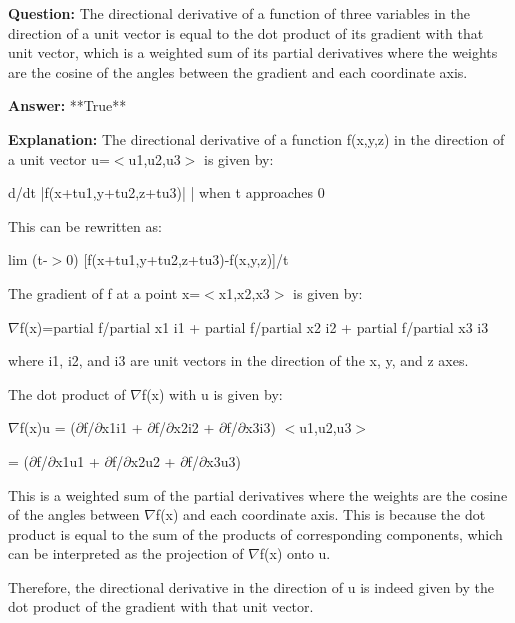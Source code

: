 \documentclass{article}
\begin{document}
                \vspace{0.5cm} 
        
            
                \textbf {Question:} The directional derivative of a function of three variables in the direction of a unit vector is equal to the dot product of its gradient with that unit vector, which is a weighted sum of its partial derivatives where the weights are the cosine of the angles between the gradient and each coordinate axis.
                
                \textbf{Answer:} **True**

                \textbf{Explanation:} The directional derivative of a function f(x,y,z) in the direction of a unit vector u=\ensuremath{<}u1,u2,u3\ensuremath{>} is given by:

d/dt |f(x+tu1,y+tu2,z+tu3)| | when t approaches 0

This can be rewritten as:

lim (t-\ensuremath{>}0) [f(x+tu1,y+tu2,z+tu3)-f(x,y,z)]/t

The gradient of f at a point x=\ensuremath{<}x1,x2,x3\ensuremath{>} is given by:

\ensuremath{\nabla}f(x)=partial f/partial x1 i1 + partial f/partial x2 i2 + partial f/partial x3 i3

where i1, i2, and i3 are unit vectors in the direction of the x, y, and z axes.

The dot product of \ensuremath{\nabla}f(x) with u is given by:

\ensuremath{\nabla}f(x){\textperiodcentered}u = (\ensuremath{\partial}f/\ensuremath{\partial}x1i1 + \ensuremath{\partial}f/\ensuremath{\partial}x2i2 + \ensuremath{\partial}f/\ensuremath{\partial}x3i3) {\textperiodcentered} \ensuremath{<}u1,u2,u3\ensuremath{>}

= (\ensuremath{\partial}f/\ensuremath{\partial}x1u1 + \ensuremath{\partial}f/\ensuremath{\partial}x2u2 + \ensuremath{\partial}f/\ensuremath{\partial}x3u3)

This is a weighted sum of the partial derivatives where the weights are the cosine of the angles between \ensuremath{\nabla}f(x) and each coordinate axis. This is because the dot product is equal to the sum of the products of corresponding components, which can be interpreted as the projection of \ensuremath{\nabla}f(x) onto u.

Therefore, the directional derivative in the direction of u is indeed given by the dot product of the gradient with that unit vector.
                
\end{document}

